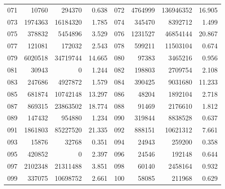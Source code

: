 \begin{longtable}{lrrr@{\hspace{16bp}}lrrr}
071 & 10760 & 294370 & 0.638 & 072 & 4764999 & 136946352 & 16.905\\
073 & 1974363 & 16184320 & 1.785 & 074 & 345470 & 8392712 & 1.499\\
075 & 378832 & 5454896 & 3.529 & 076 & 1231527 & 46854144 & 20.867\\
077 & 121081 & 172032 & 2.543 & 078 & 599211 & 11503104 & 0.674\\
079 & 6020518 & 34719744 & 14.665 & 080 & 97383 & 3465216 & 0.956\\
081 & 30943 & 0 & 1.244 & 082 & 198803 & 2709754 & 2.108\\
083 & 247686 & 4927872 & 1.579 & 084 & 390425 & 9031680 & 11.233\\
085 & 681874 & 10742148 & 13.297 & 086 & 48204 & 1892104 & 2.718\\
087 & 869315 & 23863502 & 18.774 & 088 & 91469 & 2176610 & 1.812\\
089 & 147432 & 954880 & 1.234 & 090 & 319844 & 8838528 & 0.637\\
091 & 1861803 & 85227520 & 21.335 & 092 & 888151 & 10621312 & 7.661\\
093 & 15876 & 32768 & 0.351 & 094 & 24943 & 259200 & 0.358\\
095 & 420852 & 0 & 2.397 & 096 & 24546 & 192148 & 0.644\\
097 & 2102348 & 21311488 & 3.851 & 098 & 60140 & 2458164 & 0.932\\
099 & 337075 & 10698752 & 2.661 & 100 & 58085 & 211968 & 0.629\\
\end{longtable}

